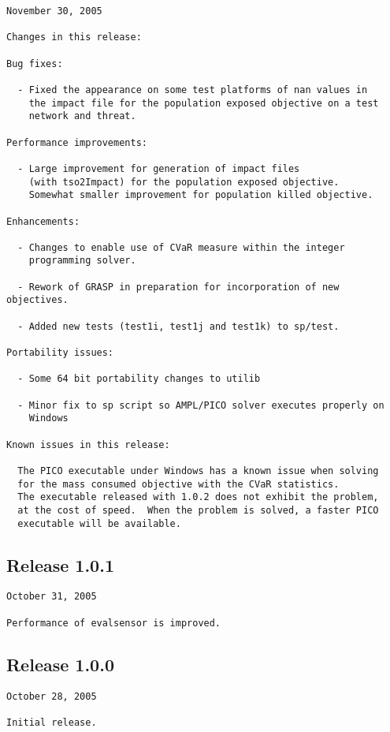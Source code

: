 \begin{verbatim}
November 30, 2005

Changes in this release:

Bug fixes:

  - Fixed the appearance on some test platforms of nan values in
    the impact file for the population exposed objective on a test 
    network and threat.

Performance improvements:

  - Large improvement for generation of impact files
    (with tso2Impact) for the population exposed objective.  
    Somewhat smaller improvement for population killed objective.

Enhancements:

  - Changes to enable use of CVaR measure within the integer 
    programming solver.

  - Rework of GRASP in preparation for incorporation of new objectives.

  - Added new tests (test1i, test1j and test1k) to sp/test.

Portability issues:

  - Some 64 bit portability changes to utilib

  - Minor fix to sp script so AMPL/PICO solver executes properly on 
    Windows

Known issues in this release:

  The PICO executable under Windows has a known issue when solving 
  for the mass consumed objective with the CVaR statistics.
  The executable released with 1.0.2 does not exhibit the problem, 
  at the cost of speed.  When the problem is solved, a faster PICO 
  executable will be available.
\end{verbatim}

\subsection{Release 1.0.1}\label{history_tevasp1_0_1}

\begin{verbatim}
October 31, 2005

Performance of evalsensor is improved.
\end{verbatim}

\subsection{Release 1.0.0}\label{history_tevasp1_0_0}

\begin{verbatim}
October 28, 2005

Initial release.
\end{verbatim}
 
